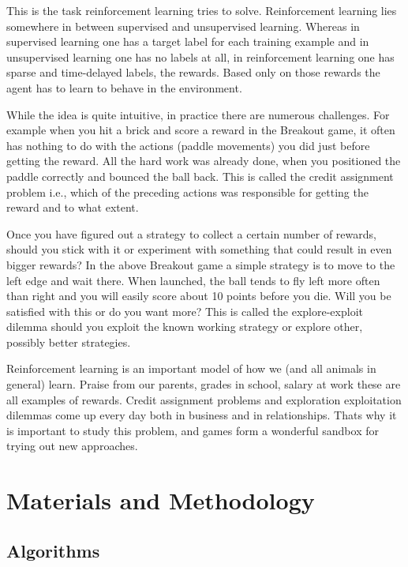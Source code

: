 \documentclass[a4paper,12pt]{report}
\begin{document}
			This is the task reinforcement learning tries to solve. Reinforcement learning lies somewhere in between supervised and unsupervised learning. Whereas in supervised learning one has a target label for each training example and in unsupervised learning one has no labels at all, in reinforcement learning one has sparse and time-delayed labels, the rewards. Based only on those rewards the agent has to learn to behave in the environment.

			While the idea is quite intuitive, in practice there are numerous challenges. For example when you hit a brick and score a reward in the Breakout game, it often has nothing to do with the actions (paddle movements) you did just before getting the reward. All the hard work was already done, when you positioned the paddle correctly and bounced the ball back. This is called the credit assignment problem i.e., which of the preceding actions was responsible for getting the reward and to what extent\cite{nervana}\cite{pong}.

			Once you have figured out a strategy to collect a certain number of rewards, should you stick with it or experiment with something that could result in even bigger rewards? In the above Breakout game a simple strategy is to move to the left edge and wait there. When launched, the ball tends to fly left more often than right and you will easily score about 10 points before you die. Will you be satisfied with this or do you want more? This is called the explore-exploit dilemma should you exploit the known working strategy or explore other, possibly better strategies\cite{nervana}\cite{pong}.

			Reinforcement learning is an important model of how we (and all animals in general) learn. Praise from our parents, grades in school, salary at work these are all examples of rewards. Credit assignment problems and exploration exploitation dilemmas come up every day both in business and in relationships. Thats why it is important to study this problem, and games form a wonderful sandbox for trying out new approaches.

	\chapter{Materials and Methodology}
		\section{Algorithms}
\end{document}
